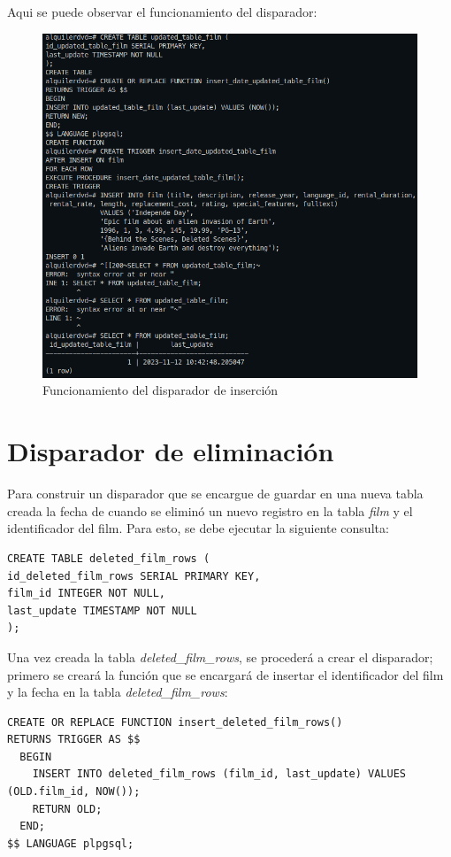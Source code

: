 \documentclass{report}
\begin{document}
Aqui se puede observar el funcionamiento del disparador:
\begin{figure}[H]
  \centering
  \includegraphics[scale=0.36]{img/trigger_insertion.png}
  \caption{Funcionamiento del disparador de inserción}
  \label{fig:funcionamiento del disparador de inserción}
\end{figure}

\cleardoublepage

\section{Disparador de eliminación}
Para construir un disparador que se encargue de guardar en una nueva tabla creada la fecha de cuando 
se eliminó un nuevo registro en la tabla \emph{film} y el identificador del film. Para esto, se debe 
ejecutar la siguiente consulta:
\begin{verbatim}
CREATE TABLE deleted_film_rows (
id_deleted_film_rows SERIAL PRIMARY KEY,
film_id INTEGER NOT NULL,
last_update TIMESTAMP NOT NULL
);
\end{verbatim}

Una vez creada la tabla \emph{deleted\_film\_rows}, se procederá a crear el disparador; primero se creará la función
que se encargará de insertar el identificador del film y la fecha en la tabla \emph{deleted\_film\_rows}:

\begin{verbatim}
CREATE OR REPLACE FUNCTION insert_deleted_film_rows()
RETURNS TRIGGER AS $$
  BEGIN
    INSERT INTO deleted_film_rows (film_id, last_update) VALUES (OLD.film_id, NOW());
    RETURN OLD;
  END;
$$ LANGUAGE plpgsql;
\end{verbatim}
\end{document}
